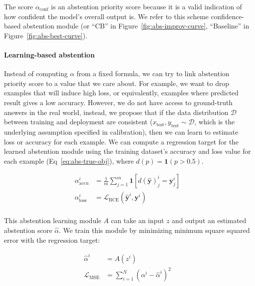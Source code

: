 \documentclass{article}[11pt,oneside]
\begin{document}
The score $\alpha_{\text{conf}}$ is an abstention priority score because it is a valid indication of how confident the model's overall output is. We refer to this scheme confidence-based abstention module (or ``CB'' in Figure~\ref{fig:abs-improv-curve}, ``Baseline'' in Figure~\ref{fig:abs-best-curve}).

\paragraph{Learning-based abstention}

Instead of computing $\alpha$ from a fixed formula, we can try to link abstention priority score to a value that we care about. For example, we want to drop examples that will induce high loss, or equivalently, examples where predicted result gives a low accuracy. However, we do not have access to ground-truth answers in the real world, instead, we propose that if the data distribution $\mathcal{D}$ between training and deployment are consistent ($x_{\text{test}}, y_{\text{test}} \sim \mathcal{D}$, which is the underlying assumption specified in calibration), then we can learn to estimate loss or accuracy for each example. 
We can compute a regression target for the learned abstention module using the training dataset's accuracy and loss value for each example (Eq~\ref{eq:abs-true-obj}), where $d(p) = \mathbf{1}(p > 0.5)$.

\begin{equation}
\begin{aligned}
\alpha_{\text{accu}}^i &= \frac{1}{m} \sum_{j=1}^m \mathbf{1}[d(\bm{\hat y})^i_j = \bm{y}^i_j] \\
\alpha_{\text{loss}}^i &= \mathcal{L}_{\text{BCE}}(\bm{\hat y}^i, \bm{y}^i) \\
\end{aligned}
\label{eq:abs-true-obj}
\end{equation}

This abstention learning module $A$ can take an input $z$ and output an estimated abstention score $\hat \alpha$. We train this module by minimizing minimum square squared error with the regression target:

\begin{equation}
\begin{aligned}
\hat \alpha^i &= A(z^i) \\ %
\mathcal{L}_{\text{MSE}} &= \sum_{i=1}^N (\alpha^i - \hat \alpha^i)^2 \\ %
\end{aligned}
\label{eq:abs-learned}
\end{equation}
\end{document}
